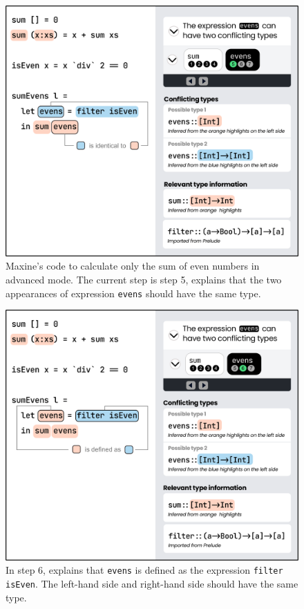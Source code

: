\begin{figure}
        \centering
        \includegraphics[width=\linewidth]{images/advanced-mode-1.pdf}
        \caption{
            Maxine's code to calculate only the sum 
            of even numbers in advanced mode. 
            The current step is step 5, \chameleon{} 
            explains that the two appearances of expression 
            \texttt{evens} should have the same type.
        }
        \label{fig:advanced-mode-step5}
\end{figure}

\begin{figure}
        \centering
        \includegraphics[width=\linewidth]{images/advanced-mode-2.pdf}
        \caption{
            In step 6, \chameleon{} 
            explains that \texttt{evens} is defined as
            the expression \texttt{filter isEven}. The left-hand side
            and right-hand side should have the same type.
        }
        \label{fig:advanced-mode-step6}
\end{figure}

